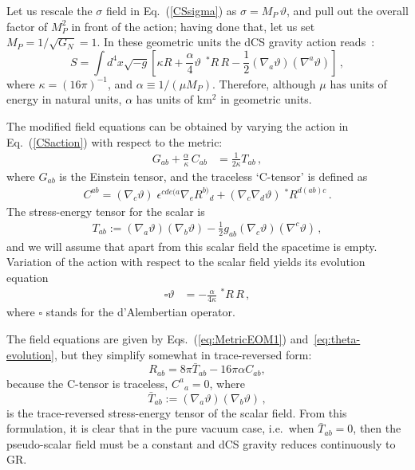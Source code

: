 \documentclass[prd,twocolumn,showpacs,superscriptaddress,nofootinbib]{revtex4-2}
\newcommand\be{\begin{equation}}
\newcommand\ee{\end{equation}}
\newcommand{\pont}{{\,^\ast\!}R\,R}
\begin{document}
Let us rescale  the  $\sigma $ field in Eq.~(\ref {CSsigma}) as $\sigma = M_P \, \vartheta$,
and pull out the overall factor of $M_P^2$ in front of the action; having done that, 
let us set   $M_P=1/ \sqrt{G_N}=1$.  In these geometric units the dCS gravity action reads~\cite{jackiw}:
%
\be
\label{CSaction}
S =  \int d^4x \sqrt{-g} \left[\kappa R + \frac{\alpha}{4} \vartheta \; \pont
- \frac{1}{2} \left(\nabla_a \vartheta\right) \left(\nabla^a \vartheta\right) \right]\,, 
\ee
%
where $\kappa = (16 \pi)^{-1}$,  and $\alpha \equiv 1/(\mu M_P)$. Therefore, although $\mu$ has units of energy in natural units, $\alpha$ has units of km$^2$ in geometric units.

The modified field equations can be obtained by varying the action in Eq.~(\ref{CSaction}) 
with respect to the metric: 
%
\begin{align}\label{eq:MetricEOM1}
G_{ab} + \frac{\alpha}{\kappa} \, C_{ab} &= \frac{1}{2 \kappa} T_{ab}\,,
\end{align}
where $G_{ab}$ is the Einstein tensor, and the traceless `C-tensor' is defined as
\begin{align}
C^{ab} = \left(\nabla_{c} \vartheta \right) \; \epsilon^{cde(a} \nabla_{e} R^{b)}{}_{d} + \left(\nabla_{c} \nabla_{d} \vartheta \right) \; {}^{\ast}R^{d(ab)c}\,.
\label{eq:C-tensor}
\end{align}
The stress-energy tensor for the scalar is 
\begin{align}
T_{ab} := \left(\nabla_{a} \vartheta \right) \left( \nabla_{b} \vartheta \right) - \frac{1}{2} g_{ab} \left(\nabla_{c} \vartheta \right) \left(\nabla^{c} \vartheta \right)\,,
\end{align}
and we will assume that apart from this scalar field the spacetime is empty. Variation of the action with respect to the scalar field yields its evolution equation
\begin{align}
\square \vartheta &= -\frac{\alpha}{4 \kappa} \, \pont\,,
\label{eq:theta-evolution}
\end{align}
where $\square$ stands for the d'Alembertian operator. 

The field equations are given by Eqs.~(\ref{eq:MetricEOM1}) and~\eqref{eq:theta-evolution}, but they simplify somewhat in trace-reversed form: 
\be
 R_{ab}  = 8 \pi \bar{T}_{ab} - 16 \pi \alpha C_{ab},
\label{eq:eom}
\ee
%
because the C-tensor is traceless, $C^a{}_a=0$, where
%
\be
\bar{T}_{ab} := \left(\nabla_{a} \vartheta \right) \left( \nabla_{b} \vartheta \right)\,,
\ee
%
is the trace-reversed stress-energy tensor of the scalar field. From this formulation, it is clear that in the pure vacuum case, i.e.~when $\bar{T}_{ab}=0$, then the pseudo-scalar field must be a constant and dCS gravity reduces continuously to GR. 
\end{document}
